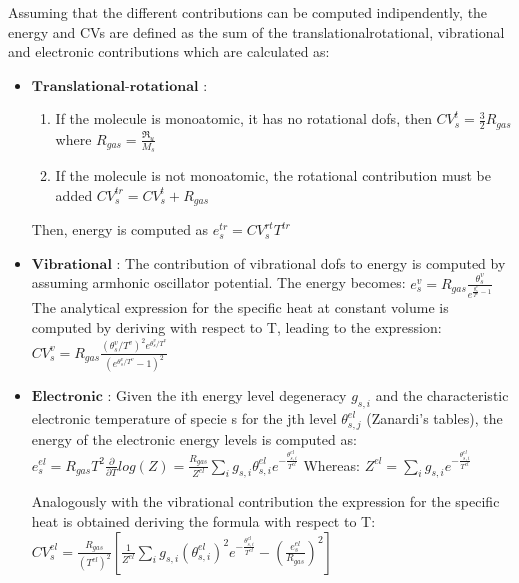 \documentclass[letterpaper,10pt,english]{jupyterBook}
\begin{document}
\sphinxAtStartPar
Assuming that the different contributions can be computed indipendently, the energy and CVs are defined as the sum of the translational\sphinxhyphen{}rotational, vibrational and electronic contributions which are calculated as:
\begin{itemize}
\item {} 
\sphinxAtStartPar
\(\textbf{Translational-rotational}\) :
\begin{enumerate}
%
\item {} 
\sphinxAtStartPar
If the molecule is monoatomic, it has no rotational dofs, then \( CV^t_s = \frac{3}{2} R_{gas} \) where \(R_{gas} = \frac{\Re_u}{M_s}\)

\item {} 
\sphinxAtStartPar
If the molecule is not monoatomic, the rotational contribution must be added \( CV^{tr}_s = CV^t_s + R_{gas} \)

\end{enumerate}

\sphinxAtStartPar
Then, energy is computed as \(e^{tr}_s = CV^{rt}_s  T^{tr}\)

\item {} 
\sphinxAtStartPar
\(\textbf{Vibrational}\) :
The contribution of vibrational dofs to energy is computed by assuming armhonic oscillator potential. The energy becomes: \(e^{v}_s = R_{gas} \frac{\theta^v_s}{e^{\frac{\theta^v_s}{T^v}-1}} \) 
The analytical expression for the specific heat at constant volume is computed by deriving with respect to T, leading to the expression: 
\(CV^{v}_s = R_{gas} \frac{(\theta^v_s/T^v)^2 e^{\theta^v_s/T^v}} {(e^{\theta^v_s/T^v}-1)^2}\)

\item {} 
\sphinxAtStartPar
\(\textbf{Electronic}\) :
Given the i\sphinxhyphen{}th energy level degeneracy \(g_{s,i}\) and the characteristic electronic temperature of specie s for the j\sphinxhyphen{}th level \(\theta^{el}_{s,j}\) (Zanardi’s tables), the energy of the electronic energy levels is computed as: \( e^{el}_s = R_{gas}T^2 \frac{\partial}{\partial T} log(Z) = \frac{R_{gas}}{Z^{el}} \sum_i g_{s,i} \theta^{el}_{s,i} e^{-\frac{\theta^{el}_{s,i}}{T^{el}}}\) 
Whereas:  \(Z^{el} = \sum_i g_{s,i} e^{-\frac{\theta^{el}_{s,i}}{T^{el}}}\)

\sphinxAtStartPar
Analogously with the vibrational contribution the expression for the specific heat is obtained deriving the formula with respect to T: \(CV^{el}_s = \frac{R_{gas}}{(T^{el})^2} \left [ \frac{1}{Z^{el}} \sum_i g_{s,i} \left( \theta^{el}_{s,i}\right)^2 e^{-\frac{\theta^{el}_{s,i}}{T^{el}}} - \left( \frac{e^{el}_s}{R_{gas}} \right)^2 \right ] \)

\end{itemize}
\end{document}
